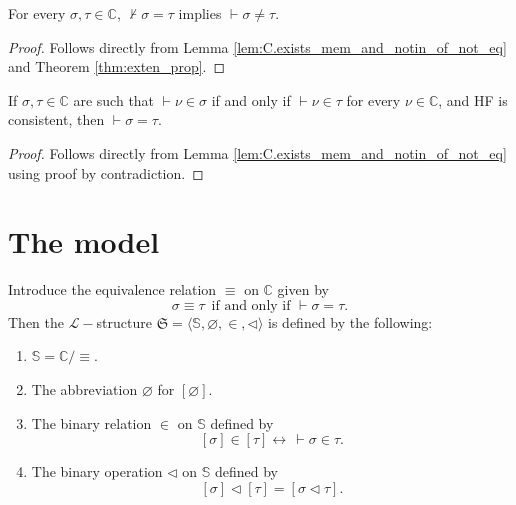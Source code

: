 \begin{corollary}
    \label{cor:C.ne_of_not_eq}
    \leanok
    For every $\sigma, \tau \in \mathbb{C}$, $\not\vdash \sigma = \tau$ implies 
    $\vdash \sigma \neq \tau$.
\end{corollary}

\begin{proof}
    \leanok
    Follows directly from Lemma \ref{lem:C.exists_mem_and_notin_of_not_eq} and 
    Theorem \ref{thm:exten_prop}.
\end{proof}

\begin{corollary}
    \label{cor:C.eq_of_forall_mem_iff_mem}
    \leanok
    If $\sigma, \tau \in \mathbb{C}$ are such that $\vdash \nu \in \sigma$ if and only if
    $\vdash \nu \in \tau$ for every $\nu \in \mathbb{C}$, and HF is consistent, 
    then $\vdash \sigma = \tau$.
\end{corollary}

\begin{proof}
    \leanok
    Follows directly from Lemma \ref{lem:C.exists_mem_and_notin_of_not_eq} 
    using proof by contradiction.
\end{proof}

\section{The model}

\begin{definition}
    \label{def:stdModel}
    \leanok
    Introduce the equivalence relation $\equiv$ on $\mathbb{C}$ given by
    $$
    \sigma \equiv \tau \,\text{ if and only if } \vdash \sigma = \tau.
    $$
    Then the $\mathcal{L}-$structure 
    $\mathfrak{S} = \langle\mathbb{S}, \varnothing, \in, \lhd \rangle$ is defined by the following:
    \begin{enumerate}
        \item $\mathbb{S} = \mathbb{C}/{\equiv}$.
        \item The abbreviation $\varnothing$ for $[\varnothing]$.
        \item The binary relation $\in$ on $\mathbb{S}$ defined by
                $$[\sigma] \in [\tau] \leftrightarrow \,\vdash \sigma \in \tau.$$
        \item The binary operation $\lhd$ on $\mathbb{S}$ defined by
                $$[\sigma] \lhd [\tau] = [\sigma \lhd \tau].$$
    \end{enumerate}
\end{definition}

